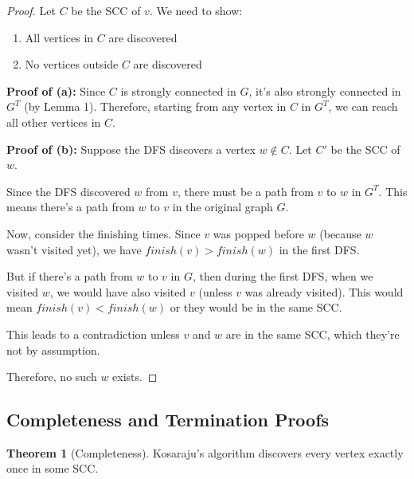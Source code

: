 \documentclass{book}
\theoremstyle{definition}
\newtheorem{theorem}[definition]{Theorem}
\begin{document}
\begin{proof}
Let $C$ be the SCC of $v$. We need to show:
\begin{enumerate}[label=(\alph*)]
    \item All vertices in $C$ are discovered
    \item No vertices outside $C$ are discovered
\end{enumerate}

\textbf{Proof of (a):} Since $C$ is strongly connected in $G$, it's also strongly connected in $G^T$ (by Lemma 1). Therefore, starting from any vertex in $C$ in $G^T$, we can reach all other vertices in $C$.

\textbf{Proof of (b):} Suppose the DFS discovers a vertex $w \notin C$. Let $C'$ be the SCC of $w$.

Since the DFS discovered $w$ from $v$, there must be a path from $v$ to $w$ in $G^T$. This means there's a path from $w$ to $v$ in the original graph $G$.

Now, consider the finishing times. Since $v$ was popped before $w$ (because $w$ wasn't visited yet), we have $finish(v) > finish(w)$ in the first DFS.

But if there's a path from $w$ to $v$ in $G$, then during the first DFS, when we visited $w$, we would have also visited $v$ (unless $v$ was already visited). This would mean $finish(v) < finish(w)$ or they would be in the same SCC.

This leads to a contradiction unless $v$ and $w$ are in the same SCC, which they're not by assumption.

Therefore, no such $w$ exists.
\end{proof}

\subsection{Completeness and Termination Proofs}

\begin{theorem}[Completeness]
Kosaraju's algorithm discovers every vertex exactly once in some SCC.
\end{theorem}
\end{document}

